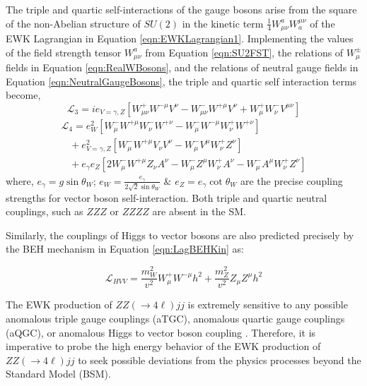 The triple and quartic self-interactions of the gauge bosons arise from the square of the non-Abelian structure of $SU(2)$ in the kinetic term $ \frac{1}{4} W^{a}_{\mu\nu} W^{\mu\nu}_{a}$ of the EWK Lagrangian in Equation \ref{eqn:EWKLagrangian1}. Implementing the values of the field strength tensor $W^{a}_{\mu\nu}$ from Equation \ref{eqn:SU2FST}, the relations of $W_{\mu}^{\pm}$ fields in Equation \ref{eqn:RealWBosons}, and the relations of neutral gauge fields in Equation \ref{eqn:NeutralGaugeBosons}, the triple and quartic self interaction terms become, 
\begin{equation}
\mathcal{L}_{3} = ie_{V=\gamma,Z} [ W^{+}_{\mu\nu} W^{-\mu} V^{\nu} - W^{-}_{\mu\nu} W^{+\mu} V^{\nu} + W_{\mu}^{+}W_{\nu}^{-}V^{\mu\nu} ] 
\label{eqn:L_TGC}
\end{equation}
\begin{equation}
\begin{array}{l}
\mathcal{L}_{4} = e^{2}_{W} [ W^{-}_{\mu}W^{+\mu}W^{-}_{\nu}W^{+\nu} - W^{-}_{\mu}W^{-\mu}W^{+}_{\nu}W^{+\nu} ] \\
 \hspace{10pt} + e^2_{V=\gamma,Z} [ W^{-}_{\mu}W^{+\mu}V_{\nu}V^{\nu} - W^{-}_{\mu}V^{\mu}W^{+}_{\nu}Z^{\nu} ] \\
  \hspace{10pt} + e_{\gamma}e_{Z} [ 2W^{-}_{\mu} W^{+\mu} Z_{\nu}A^{\nu} - W_{\mu}^{-}Z^{\mu}W^{+}_{\nu}A^{\nu} - W_{\mu}^{-}A^{\mu}W^{+}_{\nu}Z^{\nu} ]
\end{array}
\label{eqn:L_QGC}
\end{equation}
where, $e_{\gamma} = g\sin\theta_{W}$; $e_{W} = \frac{e_{\gamma}}{2\sqrt{2}\sin\theta_{W}}$ $\&$ $e_{Z} = e_{\gamma}\cot\theta_{W}$ are the precise coupling strengths for vector boson self-interaction. Both triple and quartic neutral couplings, such as $ZZZ$ or $ZZZZ$ are absent in the SM. 

Similarly, the couplings of Higgs to vector bosons are also predicted precisely by the BEH mechanism in Equation \ref{eqn:LagBEHKin} as:

\begin{equation}
\mathcal{L}_{HVV} = \frac{m_{W}^2}{v^2} W^{+}_{\mu}W^{-\mu}h^{2} + \frac{m_{Z}^{2}}{v^2} Z_{\mu}Z^{\mu}h^{2}
\label{eqn:HVVCoupling}
\end{equation}

The EWK production of $ZZ( \rightarrow 4\ell ) jj$ is extremely sensitive to any possible anomalous triple gauge couplings (aTGC), anomalous quartic gauge couplings (aQGC), or anomalous Higgs to vector boson coupling \cite{SensitivityNP} \cite{EboliModelaQGC} \cite{BSM_Simple2HDM}. Therefore, it is imperative to probe the high energy behavior of the EWK production of $ZZ( \rightarrow 4\ell ) jj$ to seek possible deviations from the physics processes beyond the Standard Model (BSM). 


